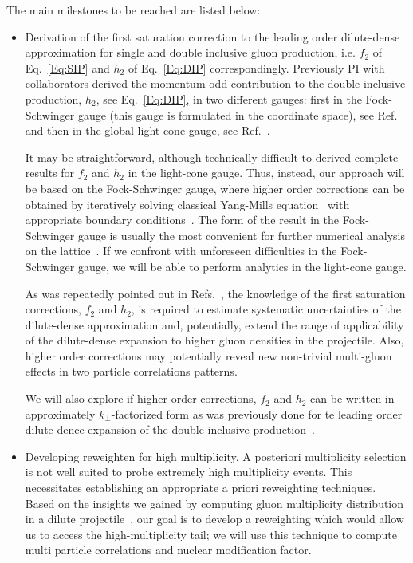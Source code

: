 		The main milestones to be reached are listed below:
		\begin{itemize}
			\item Derivation of the first saturation correction to the leading order 
				dilute-dense approximation for single and double 
				inclusive gluon production, i.e. $f_2$ of Eq.~\eqref{Eq:SIP} and $h_2$  of Eq.~\eqref{Eq:DIP} correspondingly. 
				Previously PI with collaborators
				derived the momentum odd contribution to the double inclusive production, $h_2$, see Eq.~\eqref{Eq:DIP}, 
				in two different gauges: first in  the Fock-Schwinger gauge (this gauge is formulated in the coordinate space), see Ref.~\cite{McLerran:2016snu} and 
				then in the global light-cone gauge, see Ref.~\cite{Kovchegov:2018jun}.


				It may be straightforward, although technically difficult to derived complete 
				results for  $f_2$ and $h_2$ in the light-cone gauge. Thus, instead, 
				our approach will be based on the Fock-Schwinger gauge, where higher order corrections 
				can be obtained by iteratively solving classical Yang-Mills equation~\cite{Dumitru:2001ux,McLerran:2016snu}
				with appropriate boundary conditions~\cite{Kovner:1995ts}.
				The form of the result in the Fock-Schwinger gauge is usually the most convenient for 
				further numerical analysis on the lattice~\cite{Kovchegov:2018jun}.
				If we confront with unforeseen difficulties in the Fock-Schwinger gauge,
				we will be able to perform analytics in the light-cone gauge.  


				As was repeatedly pointed out  in Refs.~\cite{Mace:2018vwq,Mace:2018yvl}, the knowledge of the first saturation corrections, 
				$f_2$ and $h_2$, is required to estimate systematic uncertainties of the dilute-dense 
				approximation and, potentially, extend the range of applicability of the dilute-dense expansion to higher 
				gluon densities in the projectile. Also, higher order corrections may potentially reveal new non-trivial multi-gluon
				effects in two particle correlations patterns.  
			
				We will also  explore if higher order corrections, $f_2$ and $h_2$ can be written in approximately 
				$k_\perp$-factorized form as was previously done for te leading order dilute-dence expansion 
				of the double inclusive production~\cite{Kovchegov:2013ewa}.

			\item Developing reweighten for high multiplicity.  A posteriori multiplicity 
				selection is not well suited to probe extremely high multiplicity events. This necessitates 
				establishing an appropriate a priori reweighting
				techniques. Based on the insights we gained by computing gluon multiplicity distribution
				in a dilute  projectile~\cite{Dumitru:2017cwt,Dumitru:2017ftq,Dumitru:2018iko}, our  goal 
				is to  develop a reweighting which would  allow us to access the
				high-multiplicity tail; we will use this technique to compute multi particle correlations
				and nuclear modification factor.  


\end{itemize}
